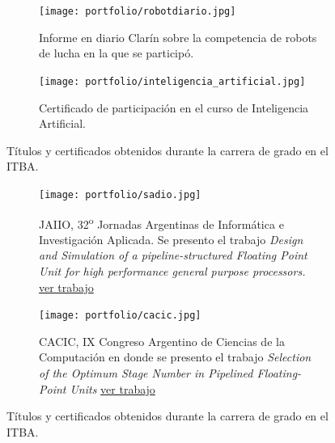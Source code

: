    \begin{figure}
      \begin{center}
      \ContinuedFloat
         \begin{subfigure}[b]{0.40\textwidth}
            \begin{center}
               \texttt{[image: portfolio/robotdiario.jpg]}
               \caption{Informe en diario Clarín sobre la competencia de robots de lucha en la que se participó.}
               \label{fig:robotdiario}
            \end{center}
         \end{subfigure}%
         \hfill
         \begin{subfigure}[b]{0.55\textwidth}
            \texttt{[image: portfolio/inteligencia\_artificial.jpg]}
            \caption{Certificado de participación en el curso de Inteligencia Artificial.}
            \label{fig:foto_ai}
         \end{subfigure}%
      \caption{Títulos y certificados obtenidos durante la carrera de grado en el ITBA.}
      \label{fig:titulos_del_itba}
      \end{center}
   \end{figure}








   \begin{figure}
      \begin{center}
      \ContinuedFloat
         \begin{subfigure}[b]{0.45\textwidth}
            \texttt{[image: portfolio/sadio.jpg]}
            \caption{JAIIO, 32\textsuperscript{o} Jornadas Argentinas de Informática e Investigación Aplicada. Se presento el trabajo \emph{Design and Simulation of a pipeline-structured Floating Point Unit for high performance general purpose processors.} \href{https://drive.google.com/open?id=15NkqA_rWbaObx1uiqe7ruBg9lWpIh5q7}{ver trabajo}}
            \label{fig:jaiio}
         \end{subfigure}%
         \hfill
         \begin{subfigure}[b]{0.45\textwidth}
            \texttt{[image: portfolio/cacic.jpg]}
            \caption{CACIC, IX Congreso Argentino de Ciencias de la Computación en donde se presento el trabajo \emph{Selection of the Optimum Stage Number in Pipelined Floating-Point Units} \href{https://drive.google.com/open?id=11z5qRrJ01Is6dx5NMHAOoXl3D0r2o8OY}{ver trabajo}}
            \label{fig:cacic}
         \end{subfigure}%
      \end{center}
      \caption{Títulos y certificados obtenidos durante la carrera de grado en el ITBA.}
      \label{fig:titulos_del_itba}
   \end{figure}




